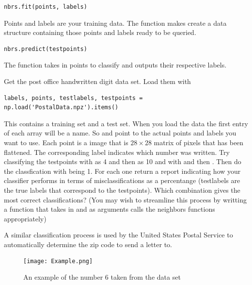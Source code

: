 \begin{lstlisting}
nbrs.fit(points, labels)
\end{lstlisting}
Points and labels are your training data. 
The  function makes  create a data structure containing those points and labels ready to be queried. 

\begin{lstlisting}
nbrs.predict(testpoints)
\end{lstlisting}

The function  takes in points to classify and outputs their respective labels.  
\begin{problem}
Get the post office handwritten digit data set. Load them with
\begin{lstlisting}
labels, points, testlabels, testpoints = np.load('PostalData.npz').items()
\end{lstlisting}
This contains a training set and a test set. 
When you load the data the first entry of each array will be a name. 
So  and  point to the actual points and labels you want to use. 
Each point is a  image that is $28 \times 28$ matrix of pixels that has been flattened. 
The corresponding label indicates which number was written.  
Try classifying the testpoints with  as 4 and then as 10 and with   and then . Then do the classfication with  being 1. 
For each one return a report indicating how your classifier performs in terms of misclassifications as a percentange (testlabels are the true labels that correspond to the testpoints). 
Which combination gives the most correct classifications?
(You may wish to streamline this process by writting a function that takes in  and  as arguments calls the neighbors functions appropriately)


A similar classification process is used by the United States Postal Service to automatically determine the zip code to send a letter to.

\begin{figure}[H]
\texttt{[image: Example.png]}
\caption{An example of the number 6 taken from the data set}
\end{figure}
\end{problem}


